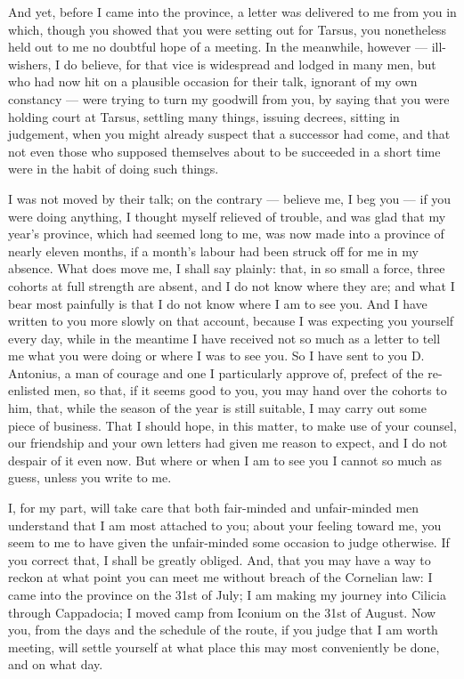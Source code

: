  And yet, before I came into the province, a letter was delivered to me from you in which, though you showed that you were setting out for Tarsus, you nonetheless held out to me no doubtful hope of a meeting. In the meanwhile, however --- ill-wishers, I do believe, for that vice is widespread and lodged in many men, but who had now hit on a plausible occasion for their talk, ignorant of my own constancy --- were trying to turn my goodwill from you, by saying that you were holding court at Tarsus, settling many things, issuing decrees, sitting in judgement, when you might already suspect that a successor had come, and that not even those who supposed themselves about to be succeeded in a short time were in the habit of doing such things.

 I was not moved by their talk; on the contrary --- believe me, I beg you --- if you were doing anything, I thought myself relieved of trouble, and was glad that my year's province, which had seemed long to me, was now made into a province of nearly eleven months, if a month's labour had been struck off for me in my absence. What does move me, I shall say plainly: that, in so small a force, three cohorts at full strength are absent, and I do not know where they are; and what I bear most painfully is that I do not know where I am to see you. And I have written to you more slowly on that account, because I was expecting you yourself every day, while in the meantime I have received not so much as a letter to tell me what you were doing or where I was to see you. So I have sent to you D. Antonius, a man of courage and one I particularly approve of, prefect of the re-enlisted men, so that, if it seems good to you, you may hand over the cohorts to him, that, while the season of the year is still suitable, I may carry out some piece of business. That I should hope, in this matter, to make use of your counsel, our friendship and your own letters had given me reason to expect, and I do not despair of it even now. But where or when I am to see you I cannot so much as guess, unless you write to me.

 I, for my part, will take care that both fair-minded and unfair-minded men understand that I am most attached to you; about your feeling toward me, you seem to me to have given the unfair-minded some occasion to judge otherwise. If you correct that, I shall be greatly obliged. And, that you may have a way to reckon at what point you can meet me without breach of the Cornelian law: I came into the province on the 31st of July; I am making my journey into Cilicia through Cappadocia; I moved camp from Iconium on the 31st of August. Now you, from the days and the schedule of the route, if you judge that I am worth meeting, will settle yourself at what place this may most conveniently be done, and on what day.
